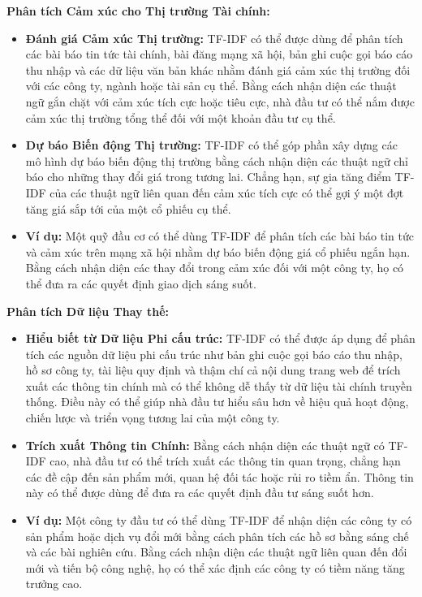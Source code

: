 \textbf{Phân tích Cảm xúc cho Thị trường Tài chính:}

\begin{itemize}
  \item \textbf{Đánh giá Cảm xúc Thị trường:} TF-IDF có thể được dùng để phân tích các bài báo tin tức tài chính, bài đăng mạng xã hội, bản ghi cuộc gọi báo cáo thu nhập và các dữ liệu văn bản khác nhằm đánh giá cảm xúc thị trường đối với các công ty, ngành hoặc tài sản cụ thể. Bằng cách nhận diện các thuật ngữ gắn chặt với cảm xúc tích cực hoặc tiêu cực, nhà đầu tư có thể nắm được cảm xúc thị trường tổng thể đối với một khoản đầu tư cụ thể.
  \item \textbf{Dự báo Biến động Thị trường:} TF-IDF có thể góp phần xây dựng các mô hình dự báo biến động thị trường bằng cách nhận diện các thuật ngữ chỉ báo cho những thay đổi giá trong tương lai. Chẳng hạn, sự gia tăng điểm TF-IDF của các thuật ngữ liên quan đến cảm xúc tích cực có thể gợi ý một đợt tăng giá sắp tới của một cổ phiếu cụ thể.
  \item \textbf{Ví dụ:} Một quỹ đầu cơ có thể dùng TF-IDF để phân tích các bài báo tin tức và cảm xúc trên mạng xã hội nhằm dự báo biến động giá cổ phiếu ngắn hạn. Bằng cách nhận diện các thay đổi trong cảm xúc đối với một công ty, họ có thể đưa ra các quyết định giao dịch sáng suốt.
\end{itemize}

\textbf{Phân tích Dữ liệu Thay thế:}

\begin{itemize}
  \item \textbf{Hiểu biết từ Dữ liệu Phi cấu trúc:} TF-IDF có thể được áp dụng để phân tích các nguồn dữ liệu phi cấu trúc như bản ghi cuộc gọi báo cáo thu nhập, hồ sơ công ty, tài liệu quy định và thậm chí cả nội dung trang web để trích xuất các thông tin chính mà có thể không dễ thấy từ dữ liệu tài chính truyền thống. Điều này có thể giúp nhà đầu tư hiểu sâu hơn về hiệu quả hoạt động, chiến lược và triển vọng tương lai của một công ty.
  \item \textbf{Trích xuất Thông tin Chính:} Bằng cách nhận diện các thuật ngữ có TF-IDF cao, nhà đầu tư có thể trích xuất các thông tin quan trọng, chẳng hạn các đề cập đến sản phẩm mới, quan hệ đối tác hoặc rủi ro tiềm ẩn. Thông tin này có thể được dùng để đưa ra các quyết định đầu tư sáng suốt hơn.
  \item \textbf{Ví dụ:} Một công ty đầu tư có thể dùng TF-IDF để nhận diện các công ty có sản phẩm hoặc dịch vụ đổi mới bằng cách phân tích các hồ sơ bằng sáng chế và các bài nghiên cứu. Bằng cách nhận diện các thuật ngữ liên quan đến đổi mới và tiến bộ công nghệ, họ có thể xác định các công ty có tiềm năng tăng trưởng cao.
\end{itemize}

